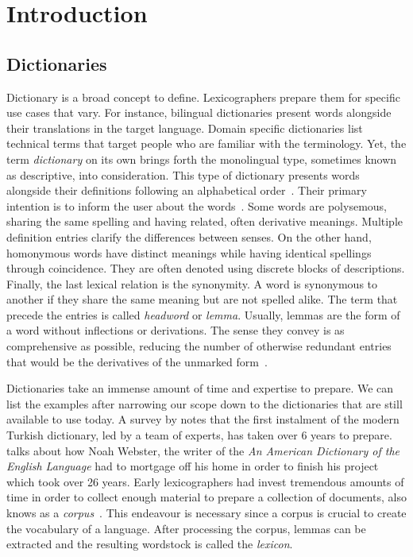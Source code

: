 \chapter{Introduction}\label{chap:introduction}%
\section{Dictionaries}%
\label{sec:dictionaries}
Dictionary is a broad concept to define.
Lexicographers prepare them for specific use cases that vary.
For instance, bilingual dictionaries present words alongside their translations in the target language.
Domain specific dictionaries list technical terms that target people who are familiar with the terminology.
Yet, the term \emph{dictionary} on its own brings forth the monolingual type, sometimes known as descriptive, into consideration.
This type of dictionary presents words alongside their definitions following an alphabetical order~\cite{sterkenburg_practical_2003}.
Their primary intention is to inform the user about the words~\cite{uzun_modern_2005}.
Some words are polysemous, sharing the same spelling and having related, often derivative meanings.
Multiple definition entries clarify the differences between senses.
On the other hand, homonymous words have distinct meanings while having identical spellings through coincidence.
They are often denoted using discrete blocks of descriptions.
Finally, the last lexical relation is the synonymity.
A word is synonymous to another if they share the same meaning but are not spelled alike.
The term that precede the entries is called \emph{headword} or \emph{lemma}.
Usually, lemmas are the form of a word without inflections or derivations.
The sense they convey is as comprehensive as possible, reducing the number of otherwise redundant entries that would be the derivatives of the unmarked form~\cite{ibrahim_usta_turkce_2006}.

Dictionaries take an immense amount of time and expertise to prepare.
We can list the examples after narrowing our scope down to the dictionaries that are still available to use today.
A survey by \textcite{uzun_1945ten_1999} notes that the first instalment of the modern Turkish dictionary, led by a team of experts, has taken over 6 years to prepare.
\textcite{kendall_forgotten_2011} talks about how Noah Webster, the writer of the \emph{An American Dictionary of the English Language} had to mortgage off his home in order to finish his project which took over 26 years.
Early lexicographers had invest tremendous amounts of time in order to collect enough material to prepare a collection of documents, also knows as a \emph{corpus}~\cite{uzun_1945ten_1999}.
This endeavour is necessary since a corpus is crucial to create the vocabulary of a language.
After processing the corpus, lemmas can be extracted and the resulting wordstock is called the \emph{lexicon}.


